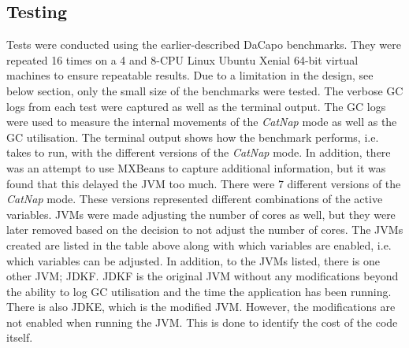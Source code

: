 \subsection{Testing}
Tests were conducted using the earlier-described DaCapo benchmarks\cite{blackburn2006dacapo}. They
were repeated 16 times on a 4 and 8-CPU Linux Ubuntu Xenial 64-bit virtual
machines to ensure repeatable results. Due to a limitation in the
design, see below section, only the small size of the benchmarks were
tested. The verbose GC logs from
each test were captured as well as the terminal output. The GC logs were
used to measure the internal movements of the \emph{CatNap} mode as well as
the GC utilisation. The terminal output shows how the benchmark
performs, i.e. takes to run, with the different versions of the \emph{CatNap}
mode. In addition, there was an attempt to use MXBeans to capture
additional information, but it was found that this delayed the JVM too
much.
\newline\newline
There were 7 different versions of the \emph{CatNap} mode. These
versions represented different combinations of the active variables.
JVMs were made adjusting the number of cores as well, but they were
later removed based on the decision to not adjust the number of cores.
\newline\newline
The JVMs created are listed in the table above along with which
variables are enabled, i.e. which variables can be adjusted. In
addition, to the JVMs listed, there is one other JVM; JDKF. JDKF is the
original JVM without any modifications beyond the ability to log GC
utilisation and the time the application has been running. There is also JDKE, which is
the modified JVM. However, the modifications are not enabled when
running the JVM. This is done to identify the cost of the code itself.
